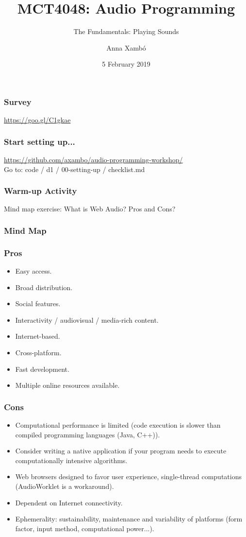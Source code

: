 \documentclass[screen, aspectratio=43]{beamer}
\title[AP-intro]{MCT4048: Audio Programming}
\subtitle{The Fundamentals: Playing Sounds}
\author[A. Xamb{\'o}]{Anna Xamb{\'o}}
\institute[NTNU]{Department of Music, NTNU}
\date{5 February 2019}
\begin{document}
\begin{frame}
  \titlepage
\end{frame}


\begin{frame}
\frametitle{Survey}
\url{https://goo.gl/C1gkae}
\end{frame}

\begin{frame}
\frametitle{Start setting up...}
\url{https://github.com/axambo/audio-programming-workshop/} 
\\
Go to: code / d1 / 00-setting-up / checklist.md

\end{frame}

\begin{frame}
\frametitle{Warm-up Activity}
Mind map exercise: What is Web Audio? Pros and Cons?
\end{frame}

\begin{frame}
\frametitle{Mind Map}
\end{frame}

\begin{frame}
\frametitle{Pros}
\begin{itemize}
\item Easy access.
\item Broad distribution.
\item Social features.
\item Interactivity / audiovisual / media-rich content.
\item Internet-based.
\item Cross-platform.
\item Fast development.
\item Multiple online resources available.
\end{itemize}
\end{frame}

\begin{frame}
\frametitle{Cons}
\begin{itemize}
\item Computational performance is limited (code execution is slower than compiled programming languages (Java, C++)).
\item Consider writing a native application if your program needs to execute computationally intensive algorithms.
\item Web browsers designed to favor user experience, single-thread computations (AudioWorklet is a workaround).
\item Dependent on Internet connectivity.
\item Ephemerality: sustainability, maintenance and variability of platforms (form factor, input method, computational power...).
\end{itemize}
\end{frame}
\end{document}
